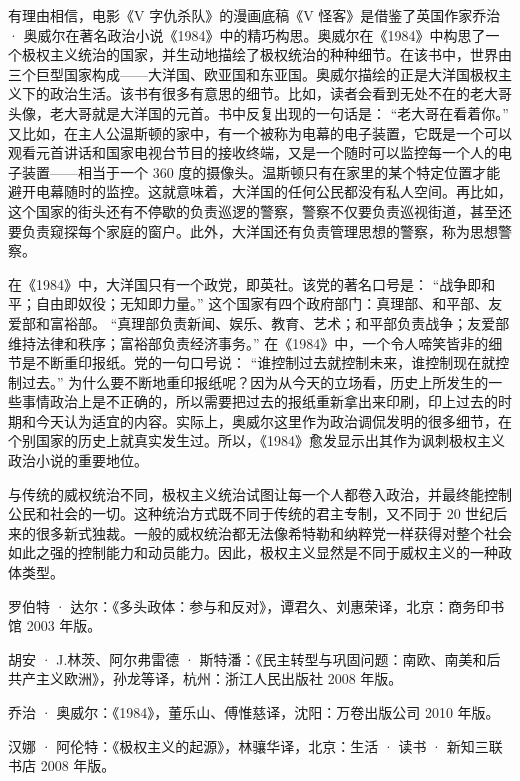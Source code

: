 有理由相信，电影《V 字仇杀队》的漫画底稿《V 怪客》是借鉴了英国作家乔治 · 奥威尔在著名政治小说《1984》中的精巧构思。奥威尔在《1984》中构思了一个极权主义统治的国家，并生动地描绘了极权统治的种种细节。在该书中，世界由三个巨型国家构成——大洋国、欧亚国和东亚国。奥威尔描绘的正是大洋国极权主义下的政治生活。该书有很多有意思的细节。比如，读者会看到无处不在的老大哥头像，老大哥就是大洋国的元首。书中反复出现的一句话是： “老大哥在看着你。” 又比如，在主人公温斯顿的家中，有一个被称为电幕的电子装置，它既是一个可以观看元首讲话和国家电视台节目的接收终端，又是一个随时可以监控每一个人的电子装置——相当于一个 360 度的摄像头。温斯顿只有在家里的某个特定位置才能避开电幕随时的监控。这就意味着，大洋国的任何公民都没有私人空间。再比如，这个国家的街头还有不停歇的负责巡逻的警察，警察不仅要负责巡视街道，甚至还要负责窥探每个家庭的窗户。此外，大洋国还有负责管理思想的警察，称为思想警察。

在《1984》中，大洋国只有一个政党，即英社。该党的著名口号是： “战争即和平；自由即奴役；无知即力量。” 这个国家有四个政府部门：真理部、和平部、友爱部和富裕部。 “真理部负责新闻、娱乐、教育、艺术；和平部负责战争；友爱部维持法律和秩序；富裕部负责经济事务。” 在《1984》中，一个令人啼笑皆非的细节是不断重印报纸。党的一句口号说： “谁控制过去就控制未来，谁控制现在就控制过去。” 为什么要不断地重印报纸呢？因为从今天的立场看，历史上所发生的一些事情政治上是不正确的，所以需要把过去的报纸重新拿出来印刷，印上过去的时期和今天认为适宜的内容。实际上，奥威尔这里作为政治调侃发明的很多细节，在个别国家的历史上就真实发生过。所以，《1984》愈发显示出其作为讽刺极权主义政治小说的重要地位。

与传统的威权统治不同，极权主义统治试图让每一个人都卷入政治，并最终能控制公民和社会的一切。这种统治方式既不同于传统的君主专制，又不同于 20 世纪后来的很多新式独裁。一般的威权统治都无法像希特勒和纳粹党一样获得对整个社会如此之强的控制能力和动员能力。因此，极权主义显然是不同于威权主义的一种政体类型。


罗伯特 · 达尔：《多头政体：参与和反对》，谭君久、刘惠荣译，北京：商务印书馆 2003 年版。

胡安 · J.林茨、阿尔弗雷德 · 斯特潘：《民主转型与巩固问题：南欧、南美和后共产主义欧洲》，孙龙等译，杭州：浙江人民出版社 2008 年版。

乔治 · 奥威尔：《1984》，董乐山、傅惟慈译，沈阳：万卷出版公司 2010 年版。

汉娜 · 阿伦特：《极权主义的起源》，林骧华译，北京：生活 · 读书 · 新知三联书店 2008 年版。
